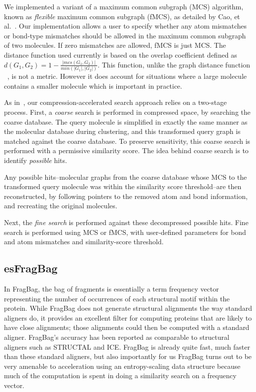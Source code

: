 \documentclass[review,preprint,12pt]{elsarticle}
\renewcommand{\cite}{\citep} %
\theoremstyle{definition}
\theoremstyle{remark}
\numberwithin{equation}{section}
\begin{document}
We implemented a variant of a maximum common subgraph (MCS) algorithm, known as 
\emph{flexible} maximum
common subgraph (fMCS), as detailed by Cao, et al.~\cite{cao2008maximum}.
Our implementation allows a user to specify whether any atom mismatches or 
bond-type mismatches should be 
allowed in the maximum common subgraph of two molecules.
If zero mismatches are allowed, fMCS is just MCS.
The distance function used currently is based on the overlap coefficient 
defined as $d(G_1,G_2) = 1 - \frac{ |mcs(G_1,G_2)| }{min(|G_1|,|G_2|)}$. This function, unlike 
the graph distance function  ~\cite{bunke1998graph}, is not a metric. However it does account for
situations where a large molecule contains a smaller molecule which is important in practice.

As in~\cite{loh2012compressive}, our compression-accelerated search approach 
relies on a two-stage process.
First, a \emph{coarse} search is performed in compressed space, by searching 
the coarse database.
The query molecule is simplified in exactly the same manner as 
the molecular database during clustering, and this transformed query graph is 
matched against the coarse database.
To preserve sensitivity, this coarse search is performed with a permissive 
similarity score.
The idea behind coarse search is to identify \emph{possible} hits.


Any possible hits--molecular graphs from the coarse database whose MCS to 
the transformed query molecule was within the similarity score threshold--are 
then reconstructed, by following
pointers to the removed atom and bond information, and recreating the 
original molecules.

Next, the \emph{fine search} is performed against these decompressed possible 
hits.
Fine search is performed using MCS or fMCS, with user-defined parameters for 
bond and atom mismatches and similarity-score threshold.


\subsection{esFragBag}
In FragBag, the bag of fragments is essentially
a term frequency vector representing the number of occurrences of each structural motif within the protein.
While FragBag does not generate structural alignments the way standard aligners do, it provides an excellent
filter for computing proteins that are likely to have close alignments; those alignments could then be computed
with a standard aligner.
FragBag's accuracy has been reported as comparable to structural aligners such as STRUCTAL and
ICE.
FragBag is already quite fast, much faster than these standard aligners, but also importantly for us
FragBag turns out to be very amenable to acceleration using an entropy-scaling data structure because much of the computation is spent in doing a similarity search on a frequency vector.
\end{document}
